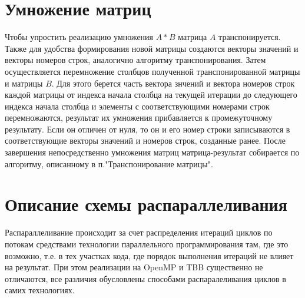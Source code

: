 \documentclass{report}
\begin{document}
\section*{Умножение матриц}
\par Чтобы упростить реализацию умножения \(A*B\) матрица \(A\) транспонируется. Также для удобства формирования новой матрицы создаются векторы значений и векторы номеров строк, аналогично алгоритму транспонирования. Затем осуществляется перемножение столбцов полученной транспонированной матрицы и матрицы \(B\). Для этого берется часть вектора знчений и вектора номеров строк каждой матрицы от индекса начала столбца на текущей итерации до следующего индекса начала столбца и элементы с соответствующими номерами строк перемножаются, результат их умножения прибавляется к промежуточному результату. Если он отличен от нуля, то он и его номер строки записываются в соответствующие векторы значений и номеров строк, созданные ранее. После завершения непосредственно умножения матриц матрица-результат собирается по алгоритму, описанному в п."Транспонирование матрицы".

\newpage

\section*{Описание схемы распараллеливания}
\par Распараллеливание происходит за счет распределения итераций циклов по потокам средствами технологии параллельного программирования там, где это возможно, т.е. в тех участках кода, где порядок выполнения итераций не влияет на результат. При этом реализации на OpenMP и TBB существенно не отличаются, все различия обусловлены способами распаралеливания циклов в самих технологиях.

\newpage

\end{document}
